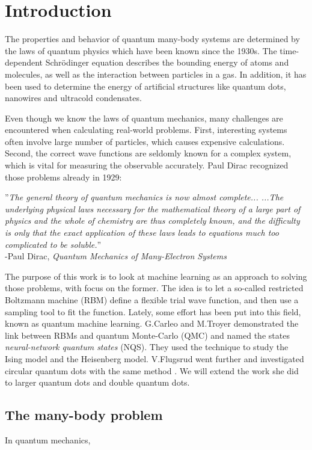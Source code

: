 \chapter{Introduction}
The properties and behavior of quantum many-body systems are determined by the laws of quantum physics which have been known since the 1930s. The time-dependent Schrödinger equation describes the bounding energy of atoms and molecules, as well as the interaction between particles in a gas. In addition, it has been used to determine the energy of artificial structures like quantum dots, nanowires and ultracold condensates.

Even though we know the laws of quantum mechanics, many challenges are encountered when calculating real-world problems. First, interesting systems often involve large number of particles, which causes expensive calculations. Second, the correct wave functions are seldomly known for a complex system, which is vital for measuring the observable accurately. Paul Dirac recognized those problems already in 1929: \cite{dirac_paul_adrien_maurice_quantum_1929}\bigskip


''\textit{The general theory of quantum mechanics is now almost complete... ...The underlying physical laws necessary for the mathematical theory of a large part of physics and the whole of chemistry are thus completely known, and the difficulty is only that the exact application of these laws leads to equations much too complicated to be soluble.}''\\ 
-Paul Dirac, \textit{Quantum Mechanics of Many-Electron Systems} \bigskip

The purpose of this work is to look at machine learning as an approach to solving those problems, with focus on the former. The idea is to let a so-called restricted Boltzmann machine (RBM) define a flexible trial wave function, and then use a sampling tool to fit the function. Lately, some effort has been put into this field, known as quantum machine learning. G.Carleo and M.Troyer demonstrated the link between RBMs and quantum Monte-Carlo (QMC) and named the states \textit{neural-network quantum states} (NQS). They used the technique to study the Ising model and the Heisenberg model. \cite{carleo_solving_2017} V.Flugsrud went further and investigated circular quantum dots with the same method \cite{flugsrud_vilde_moe_solving_nodate}. We will extend the work she did to larger quantum dots and double quantum dots.

\section{The many-body problem}
In quantum mechanics, 

